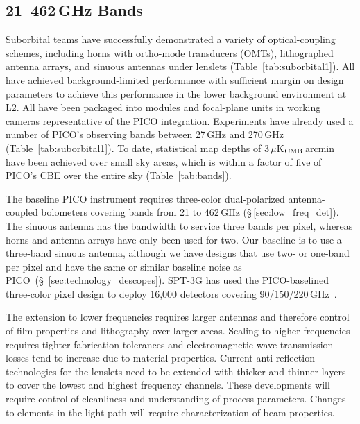 \medskip
\subsection{21--462\,GHz Bands}
\label{sec:bolometers} %

%
Suborbital teams have successfully demonstrated a variety of optical-coupling schemes, including horns with ortho-mode transducers (OMTs), lithographed antenna arrays, and sinuous antennas under lenslets (Table~\ref{tab:suborbital1}). All have achieved background-limited performance with sufficient margin on design parameters to achieve this performance in the lower background environment at L2. All have been packaged into modules and focal-plane units in working cameras representative of the PICO integration. Experiments have already used a number of PICO's observing bands between 27\,GHz and 270\,GHz (Table~\ref{tab:suborbital1}).  To date, statistical map depths of 3\,$\mu$K$_{\rm CMB}$\,arcmin have been achieved over small sky areas, which is within a factor of five of PICO's CBE over the entire sky (Table~\ref{tab:bands}). %




The baseline PICO instrument requires three-color dual-polarized antenna-coupled bolometers covering bands from 21 to 462\,GHz (\S\,\ref{sec:low_freq_det}).  The sinuous antenna has the bandwidth to service three bands per pixel, whereas horns and antenna arrays have only been used for two. Our baseline is to use a three-band sinuous antenna, although we have designs that use two- or one-band per pixel and have the same or similar baseline noise as PICO~(\S~\ref{sec:technology_descopes}). SPT-3G has used the PICO-baselined three-color pixel design to deploy 16,000 detectors covering 90/150/220\,GHz~\citep{Dutcher2018}.


The extension to lower frequencies requires larger antennas and therefore control of film properties and lithography over larger areas. Scaling to higher frequencies requires tighter fabrication tolerances and electromagnetic wave transmission losses tend to increase due to material properties. Current anti-reflection technologies for the lenslets need to be extended with thicker and thinner layers to cover the lowest and highest frequency channels. These developments will require control of cleanliness and understanding of process parameters. Changes to elements in the light path will require characterization of beam properties.

